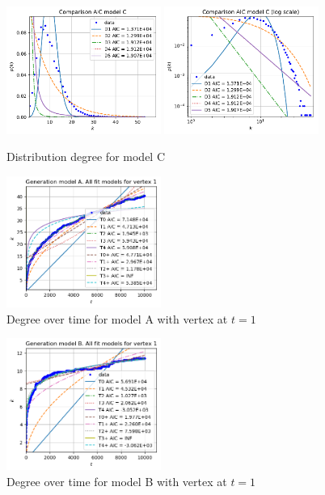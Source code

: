 \documentclass[a4paper]{article}
\begin{document}
%
\begin{figure}[H]
		\centering
		\includegraphics[width=0.45\textwidth]{modelC/all_dd.pdf}
		\includegraphics[width=0.45\textwidth]{modelC/all_log_dd.pdf}
		\caption{Distribution degree for model C}
		\label{fig:all_dd_C}
\end{figure}
%
\begin{figure}[H]
    \centering
		\includegraphics[width=0.45\textwidth]{modelA/all_dt1.png}
		\caption{Degree over time for model A with vertex at $t=1$}
\end{figure}
%
\begin{figure}[H]
    \centering
		\includegraphics[width=0.45\textwidth]{modelB/all_dt1.png}
		\caption{Degree over time for model B with vertex at $t=1$}
\end{figure}
\end{document}
